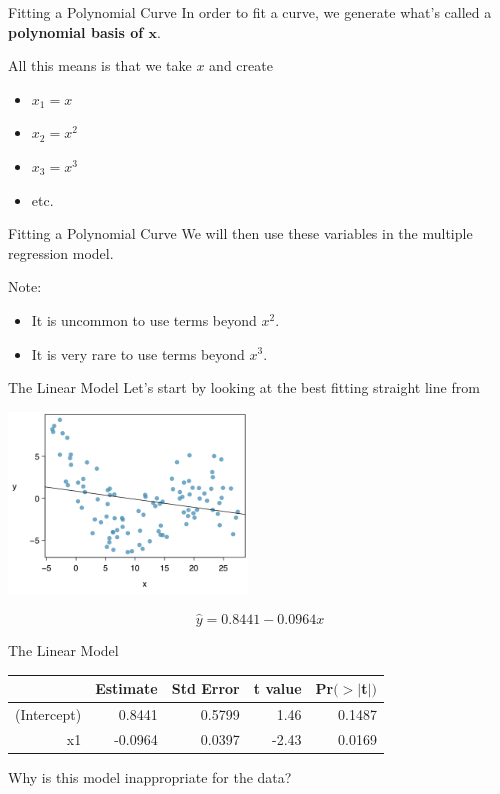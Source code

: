 \begin{frame}{Fitting a Polynomial Curve}
    In order to fit a curve, we generate what's called a \textbf{polynomial basis of $\boldsymbol{x}$}.
    
    \vspace{18pt}All this means is that we take $x$ and create
    \begin{itemize}
        \item $x_1 = x$
        \item $x_2 = x^2$
        \item $x_3 = x^3$
        \item etc.
    \end{itemize}
\end{frame}

\begin{frame}{Fitting a Polynomial Curve}
    We will then use these variables in the multiple regression model.
    
    \vspace{12pt}Note:
    \begin{itemize}
        \item It is uncommon to use terms beyond $x^2$.
        \item It is very rare to use terms beyond $x^3$.
    \end{itemize}
\end{frame}

\begin{frame}{The Linear Model}
    Let's start by looking at the best fitting straight line from
    \begin{center}
        \includegraphics[width=2.5in]{images/nonlindata3.png}
    \end{center}
    \[
        \hat{y} = 0.8441 - 0.0964x
    \]
\end{frame}

\begin{frame}{The Linear Model}
    \begin{table}[h]
        \centering
        \begin{tabular}{r rrrr}
            \hline
             & Estimate & Std Error & t value & Pr$(>|$t$|)$ \\
            \hline
            (Intercept) & 0.8441 & 0.5799 & 1.46 & 0.1487 \\
            x1 & -0.0964 & 0.0397 & -2.43 & 0.0169 \\
            \hline
        \end{tabular}
    \end{table}
    
    Why is this model inappropriate for the data?
\end{frame}

